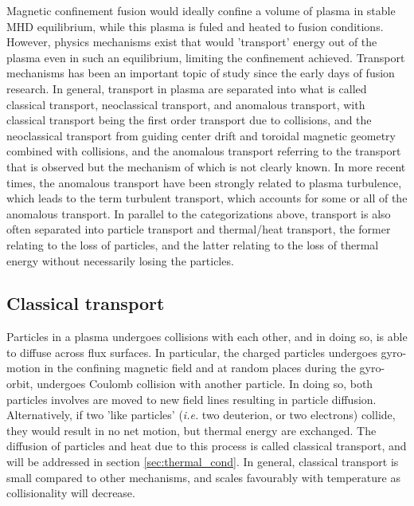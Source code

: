 \begin{refsection}
Magnetic confinement fusion would ideally confine a volume of plasma in stable MHD equilibrium, while this plasma is fuled and heated to fusion conditions. However, physics mechanisms exist that would 'transport' energy out of the plasma even in such an equilibrium, limiting the confinement achieved. Transport mechanisms has been an important topic of study since the early days of fusion research. In general, transport in plasma are separated into what is called classical transport, neoclassical transport, and anomalous transport, with classical transport being the first order transport due to collisions, and the neoclassical transport from guiding center drift and toroidal magnetic geometry combined with collisions, and the anomalous transport referring to the transport that is observed but the mechanism of which is not clearly known. In more recent times, the anomalous transport have been strongly related to plasma turbulence, which leads to the term turbulent transport, which accounts for some or all of the anomalous transport. In parallel to the categorizations above, transport is also often separated into particle transport and thermal/heat transport, the former relating to the loss of particles, and the latter relating to the loss of thermal energy without necessarily losing the particles.
\subsection{Classical transport}

Particles in a plasma undergoes collisions with each other, and in doing so, is able to diffuse across flux surfaces. In particular, the charged particles undergoes gyro-motion in the confining magnetic field and at random places during the gyro-orbit, undergoes Coulomb collision with another particle. In doing so, both particles involves are moved to new field lines resulting in particle diffusion. Alternatively, if two 'like particles' (\textit{i.e.} two deuterion, or two electrons) collide, they would result in no net motion, but thermal energy are exchanged. The diffusion of particles and heat due to this process is called classical transport, and will be addressed in section \ref{sec:thermal_cond}. In general, classical transport is small compared to other mechanisms, and scales favourably with temperature as collisionality will decrease.


\end{refsection}
